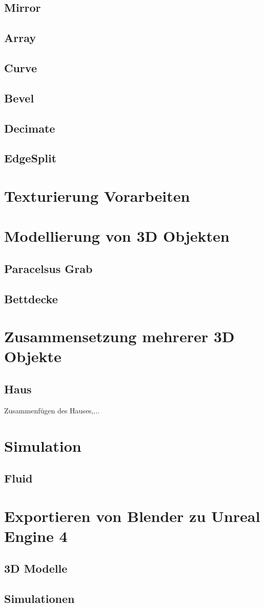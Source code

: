 \subsection{Mirror}
\subsection{Array}
\subsection{Curve}
\subsection{Bevel}
\subsection{Decimate}
\subsection{EdgeSplit}
\section{Texturierung Vorarbeiten}

\section{Modellierung von 3D Objekten}
\label{sec:Modellierung_von_3D_Objekten}
\subsection{Paracelsus Grab}
\subsection{Bettdecke}

\section{Zusammensetzung mehrerer 3D Objekte}
\subsection{Haus}
Zusammenfügen des Hauses,...

\section{Simulation}
\subsection{Fluid}

\section{Exportieren von Blender zu Unreal Engine 4}
\label{sec:Exportieren_von_Blender_zu_Unreal_Engine_4}
\subsection{3D Modelle}
\subsection{Simulationen}

